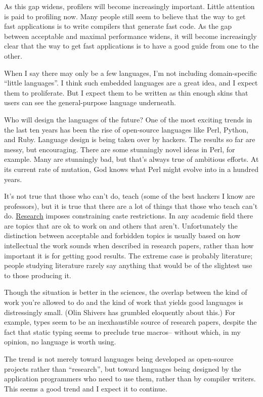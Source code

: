 As this gap widens, profilers will become increasingly important. Little
attention is paid to profiling now. Many people still seem to believe
that the way to get fast applications is to write compilers that
generate fast code. As the gap between acceptable and maximal
performance widens, it will become increasingly clear that the way to
get fast applications is to have a good guide from one to the other.

When I say there may only be a few languages, I'm not including
domain-specific ``little languages''. I think such embedded languages
are a great idea, and I expect them to proliferate. But I expect them to
be written as thin enough skins that users can see the general-purpose
language underneath.

Who will design the languages of the future? One of the most exciting
trends in the last ten years has been the rise of open-source languages
like Perl, Python, and Ruby. Language design is being taken over by
hackers. The results so far are messy, but encouraging. There are some
stunningly novel ideas in Perl, for example. Many are stunningly bad,
but that's always true of ambitious efforts. At its current rate of
mutation, God knows what Perl might evolve into in a hundred years.

It's not true that those who can't do, teach (some of the best hackers I
know are professors), but it is true that there are a lot of things that
those who teach can't do. \href{desres.html}{Research} imposes
constraining caste restrictions. In any academic field there are topics
that are ok to work on and others that aren't. Unfortunately the
distinction between acceptable and forbidden topics is usually based on
how intellectual the work sounds when described in research papers,
rather than how important it is for getting good results. The extreme
case is probably literature; people studying literature rarely say
anything that would be of the slightest use to those producing it.

Though the situation is better in the sciences, the overlap between the
kind of work you're allowed to do and the kind of work that yields good
languages is distressingly small. (Olin Shivers has grumbled eloquently
about this.) For example, types seem to be an inexhaustible source of
research papers, despite the fact that static typing seems to preclude
true macros-- without which, in my opinion, no language is worth using.

The trend is not merely toward languages being developed as open-source
projects rather than ``research'', but toward languages being designed
by the application programmers who need to use them, rather than by
compiler writers. This seems a good trend and I expect it to continue.

